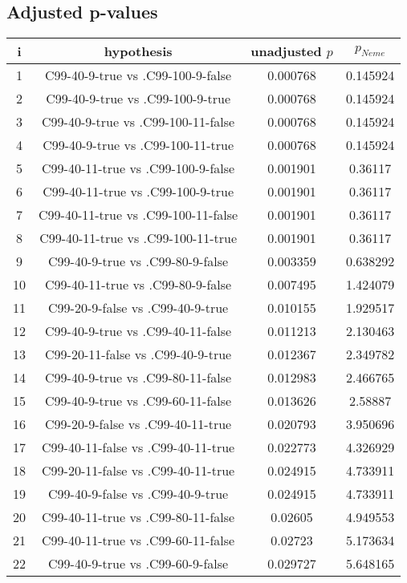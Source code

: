 \documentclass[a4paper,10pt]{article}
\begin{document}
\begin{landscape}
\pagebreak

\subsection{Adjusted p-values}

\begin{table}[!htp]
\centering\scriptsize
\begin{tabular}{cccc}
i&hypothesis&unadjusted $p$&$p_{Neme}$\\
\hline1&C99-40-9-true vs .C99-100-9-false&0.000768&0.145924\\
2&C99-40-9-true vs .C99-100-9-true&0.000768&0.145924\\
3&C99-40-9-true vs .C99-100-11-false&0.000768&0.145924\\
4&C99-40-9-true vs .C99-100-11-true&0.000768&0.145924\\
5&C99-40-11-true vs .C99-100-9-false&0.001901&0.36117\\
6&C99-40-11-true vs .C99-100-9-true&0.001901&0.36117\\
7&C99-40-11-true vs .C99-100-11-false&0.001901&0.36117\\
8&C99-40-11-true vs .C99-100-11-true&0.001901&0.36117\\
9&C99-40-9-true vs .C99-80-9-false&0.003359&0.638292\\
10&C99-40-11-true vs .C99-80-9-false&0.007495&1.424079\\
11&C99-20-9-false vs .C99-40-9-true&0.010155&1.929517\\
12&C99-40-9-true vs .C99-40-11-false&0.011213&2.130463\\
13&C99-20-11-false vs .C99-40-9-true&0.012367&2.349782\\
14&C99-40-9-true vs .C99-80-11-false&0.012983&2.466765\\
15&C99-40-9-true vs .C99-60-11-false&0.013626&2.58887\\
16&C99-20-9-false vs .C99-40-11-true&0.020793&3.950696\\
17&C99-40-11-false vs .C99-40-11-true&0.022773&4.326929\\
18&C99-20-11-false vs .C99-40-11-true&0.024915&4.733911\\
19&C99-40-9-false vs .C99-40-9-true&0.024915&4.733911\\
20&C99-40-11-true vs .C99-80-11-false&0.02605&4.949553\\
21&C99-40-11-true vs .C99-60-11-false&0.02723&5.173634\\
22&C99-40-9-true vs .C99-60-9-false&0.029727&5.648165\\

\end{tabular}
\end{table}
\end{landscape}
\end{document}
